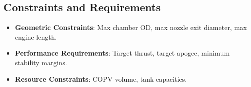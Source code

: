 \subsection{Constraints and Requirements}
\begin{itemize}
    \item \textbf{Geometric Constraints}: Max chamber OD, max nozzle exit diameter, max engine length.
    \item \textbf{Performance Requirements}: Target thrust, target apogee, minimum stability margins.
    \item \textbf{Resource Constraints}: COPV volume, tank capacities.
\end{itemize}

